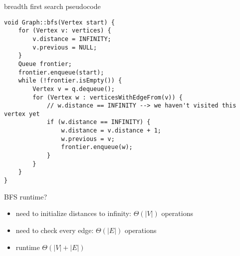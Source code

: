 \begin{frame}{breadth first search pseudocode}
\lstset{language=C++,style=small}
\begin{lstlisting}
void Graph::bfs(Vertex start) {
    for (Vertex v: vertices) {
        v.distance = INFINITY;
        v.previous = NULL;
    }
    Queue frontier;
    frontier.enqueue(start);
    while (!frontier.isEmpty()) {
        Vertex v = q.dequeue();
        for (Vertex w : verticesWithEdgeFrom(v)) {
            // w.distance == INFINITY --> we haven't visited this vertex yet
            if (w.distance == INFINITY) {
                w.distance = v.distance + 1;
                w.previous = v;
                frontier.enqueue(w);
            } 
        }
    }
}
\end{lstlisting}
\end{frame}

\begin{frame}{BFS runtime?}
\begin{itemize}
\item need to initialize distances to infinity: $\Theta(|V|)$ operations
\item need to check every edge: $\Theta(|E|)$ operations
\item runtime $\Theta(|V|+|E|)$
\end{itemize}
\end{frame}
